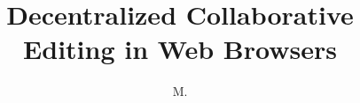 \documentclass[francais, 12pt, fancyChapter, oneside]{these-LUNAM-UBL}
\title{Decentralized Collaborative Editing in Web Browsers}
\author{M.}{Brice}{Nédelec}
\date{}
\begin{document}
\maketitle%
\dominitoc%

\begingroup
\tableofcontents\clearpage
\let\cleardoublepage\relax
\let\clearpage\relax
\listoffigures
\vspace{-30pt}
\renewcommand\listalgorithmname{Liste des algorithmes}
\listofalgorithms%
\vspace{-30pt}
\listoftables
\endgroup



\setlength{\parskip}{0.5em}










\end{document}

